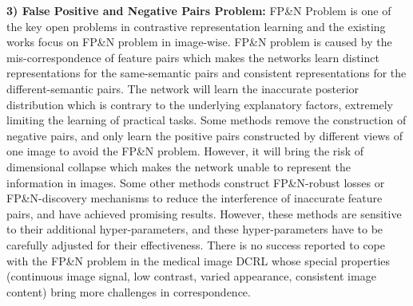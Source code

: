 \textbf{3) False Positive and Negative Pairs Problem:} FP\&N Problem \cite{chuang2020debiased,chuang2022robust} is one of the key open problems in contrastive representation learning \cite{Chen2021CVPR,grill2020bootstrap,chen2020simple,He2020CVPR,caron2018deep} and the existing works focus on FP\&N problem in image-wise. FP\&N problem is caused by the mis-correspondence of feature pairs which makes the networks learn distinct representations for the same-semantic pairs and consistent representations for the different-semantic pairs. The network will learn the inaccurate posterior distribution which is contrary to the underlying explanatory factors, extremely limiting the learning of practical tasks. Some methods \cite{grill2020bootstrap,xie2021propagate} remove the construction of negative pairs, and only learn the positive pairs constructed by different views of one image to avoid the FP\&N problem. However, it will bring the risk of dimensional collapse \cite{jing2021understanding} which makes the network unable to represent the information in images. Some other methods \cite{chuang2020debiased,chuang2022robust,huynh2022boosting} construct FP\&N-robust losses or FP\&N-discovery mechanisms to reduce the interference of inaccurate feature pairs, and have achieved promising results. However, these methods are sensitive to their additional hyper-parameters, and these hyper-parameters have to be carefully adjusted for their effectiveness. There is no success reported to cope with the FP\&N problem in the medical image DCRL whose special properties (continuous image signal, low contrast, varied appearance, consistent image content) bring more challenges in correspondence.

